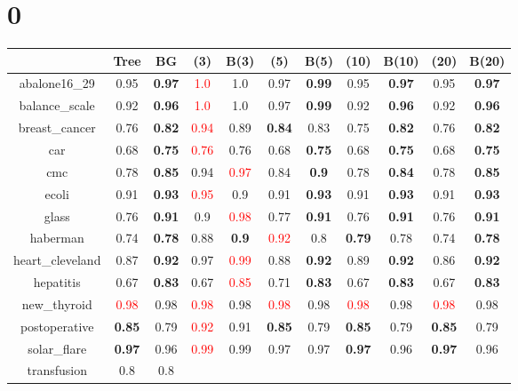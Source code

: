 \documentclass{article}%
\begin{document}
%
\normalsize%
\section*{0}%
\begin{tabular}{c|cccccccccc}%
\hline%
&Tree&BG&(3)&B(3)&(5)&B(5)&(10)&B(10)&(20)&B(20)\\%
\hline%
abalone16\_29&0.95&\textbf{0.97}&\textcolor{red}{ 
1.0
}&1.0&0.97&\textbf{0.99}&0.95&\textbf{0.97}&0.95&\textbf{0.97}\\%
\hline%
balance\_scale&0.92&\textbf{0.96}&\textcolor{red}{ 
1.0
}&1.0&0.97&\textbf{0.99}&0.92&\textbf{0.96}&0.92&\textbf{0.96}\\%
\hline%
breast\_cancer&0.76&\textbf{0.82}&\textcolor{red}{ 
0.94
}&0.89&\textbf{0.84}&0.83&0.75&\textbf{0.82}&0.76&\textbf{0.82}\\%
\hline%
car&0.68&\textbf{0.75}&\textcolor{red}{ 
0.76
}&0.76&0.68&\textbf{0.75}&0.68&\textbf{0.75}&0.68&\textbf{0.75}\\%
\hline%
cmc&0.78&\textbf{0.85}&0.94&\textcolor{red}{ 
0.97
}&0.84&\textbf{0.9}&0.78&\textbf{0.84}&0.78&\textbf{0.85}\\%
\hline%
ecoli&0.91&\textbf{0.93}&\textcolor{red}{ 
0.95
}&0.9&0.91&\textbf{0.93}&0.91&\textbf{0.93}&0.91&\textbf{0.93}\\%
\hline%
glass&0.76&\textbf{0.91}&0.9&\textcolor{red}{ 
0.98
}&0.77&\textbf{0.91}&0.76&\textbf{0.91}&0.76&\textbf{0.91}\\%
\hline%
haberman&0.74&\textbf{0.78}&0.88&\textbf{0.9}&\textcolor{red}{ 
0.92
}&0.8&\textbf{0.79}&0.78&0.74&\textbf{0.78}\\%
\hline%
heart\_cleveland&0.87&\textbf{0.92}&0.97&\textcolor{red}{ 
0.99
}&0.88&\textbf{0.92}&0.89&\textbf{0.92}&0.86&\textbf{0.92}\\%
\hline%
hepatitis&0.67&\textbf{0.83}&0.67&\textcolor{red}{ 
0.85
}&0.71&\textbf{0.83}&0.67&\textbf{0.83}&0.67&\textbf{0.83}\\%
\hline%
new\_thyroid&\textcolor{red}{ 
0.98
}&0.98&\textcolor{red}{ 
0.98
}&0.98&\textcolor{red}{ 
0.98
}&0.98&\textcolor{red}{ 
0.98
}&0.98&\textcolor{red}{ 
0.98
}&0.98\\%
\hline%
postoperative&\textbf{0.85}&0.79&\textcolor{red}{ 
0.92
}&0.91&\textbf{0.85}&0.79&\textbf{0.85}&0.79&\textbf{0.85}&0.79\\%
\hline%
solar\_flare&\textbf{0.97}&0.96&\textcolor{red}{ 
0.99
}&0.99&0.97&0.97&\textbf{0.97}&0.96&\textbf{0.97}&0.96\\%
\hline%
transfusion&0.8&0.8&\textcolor{red}{ 
}
\end{tabular}
\end{document}
